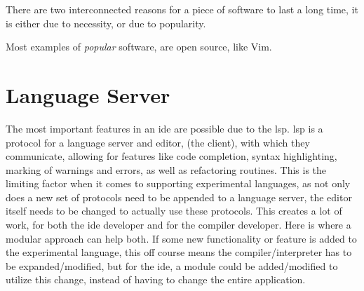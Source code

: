 There are two interconnected reasons for a piece of software to last a long
time, it is either due to necessity, or due to popularity.


Most examples of \textit{popular} software, are open source, like Vim.

\section{Language Server}


The most important features in an \gls{ide} are possible due to the \gls{lsp}.
\gls{lsp} is a protocol for a language server and editor, (the client),
with which they communicate, allowing for features like code completion, syntax
highlighting, marking of warnings and errors, as well as refactoring routines.
This is the limiting factor when it comes to supporting experimental languages,
as not only does a new set of protocols need to be appended to a language server,
the editor itself needs to be changed to actually use these protocols. This
creates a lot of work, for both the \gls{ide} developer and for the compiler
developer. Here is where a modular approach can help both. If some new
functionality or feature is added to the experimental language, this off course
means the compiler/interpreter has to be expanded/modified, but for the
\gls{ide}, a module could be added/modified to utilize this change, instead of
having to change the entire application.
